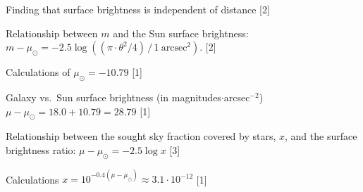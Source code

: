 Finding that surface brightness is independent of distance \hfill[2]

Relationship between $m$ and the Sun surface brightness:
$m - \mu_\odot = -2.5 \log\left( (\pi\cdot\theta^2/4) \,/\, 1~\mathrm{arcsec}^2 \right)$. \hfill[2]

Calculations of $\mu_\odot = -10.79$ \hfill[1]

Galaxy vs.\ Sun surface brightness (in magnitudes$\cdot$arcsec$^{-2}$)\\
$\mu - \mu_\odot = 18.0 + 10.79 = 28.79$ \hfill[1]

Relationship between the sought sky fraction covered by stars, $x$,
and the surface brightness ratio: $\mu - \mu_\odot = -2.5 \log x$ \hfill[3]

Calculations $x = 10^{-0.4(\mu - \mu_\odot)} \approx 3.1 \cdot 10^{-12}$ \hfill[1]

